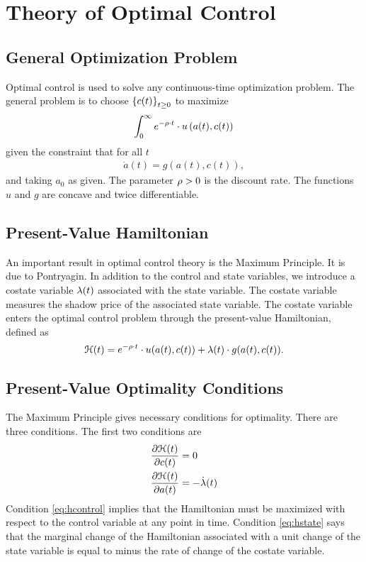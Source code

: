 \documentclass[letterpaper,12pt,leqno]{article}
\begin{document}
\section{Theory of Optimal Control}


\subsection{General Optimization Problem}

Optimal control is used to solve any continuous-time optimization problem. The general problem is to choose $\left\lbrace c(t) \right\rbrace_{t\geq 0}$ to maximize
\begin{align}
\int_{0}^{\infty}e^{-\rho\cdot  t}\cdot  u\left(  a(t),c(t) \right)\label{dpc} 
\end{align}
given the constraint that for all $t$
\begin{align}
\dot{a}(t) = g(a(t),c(t)),\label{eq:thelaw}
\end{align}
and taking $a_{0}$ as given. The parameter $\rho >0$ is the discount rate. The functions $u$ and $g$ are concave and twice differentiable.

\subsection{Present-Value Hamiltonian}

An important result in optimal control theory is the Maximum Principle. It is due to Pontryagin. In addition to the control and state variables, we introduce a costate variable $\lambda (t)$  associated with the state variable. The costate variable measures the shadow price of the associated state variable. The costate variable enters the optimal control problem through the present-value Hamiltonian, defined as 
\begin{equation}
\mathcal{H}(t)=e^{-\rho\cdot  t}\cdot  u(a(t),c(t)) +\lambda(t)\cdot g(a(t),c(t)).  
\label{eq:HAMILDEF}\end{equation}

\subsection{Present-Value Optimality Conditions}

The Maximum Principle gives necessary conditions for optimality. There are three conditions. The first two conditions are
\begin{align}
\frac{\partial \mathcal{H}(t)}{\partial c(t)} &=0  \label{eq:hcontrol} \\
\frac{\partial \mathcal{H}(t)}{\partial a(t)} &=-\dot{\lambda}(t)  \label{eq:hstate}
\end{align}
Condition \eqref{eq:hcontrol} implies that the Hamiltonian must be maximized
with respect to the control variable at any point in time. Condition \eqref{eq:hstate} says that the marginal change of the Hamiltonian associated with a unit change of the state variable is equal to  minus the rate of
change of the costate variable. 
\end{document}
